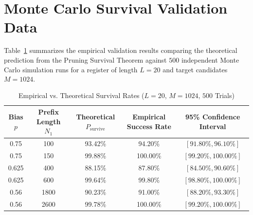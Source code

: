 \section{Monte Carlo Survival Validation Data}
\label{sec:mc_validation_data}

Table~\ref{tab:mc_validation} summarizes the empirical validation results comparing the theoretical prediction from the Pruning Survival Theorem against $500$ independent Monte Carlo simulation runs for a register of length $L=20$ and target candidates $M=1024$.

\begin{table}[h!]
\centering
\caption{Empirical vs. Theoretical Survival Rates ($L=20$, $M=1024$, $500$ Trials)}
\label{tab:mc_validation}
\begin{tabular}{ccccc}
\toprule
Bias $p$ & Prefix Length $N_1$ & Theoretical $P_{\text{survive}}$ & Empirical Success Rate & 95\% Confidence Interval \\
\midrule
0.75  & 100 & 93.42\% & 94.20\% & $[91.80\%, 96.10\%]$ \\
0.75  & 150 & 99.88\% & 100.00\% & $[99.20\%, 100.00\%]$ \\
0.625 & 400 & 88.15\% & 87.80\% & $[84.50\%, 90.60\%]$ \\
0.625 & 600 & 99.64\% & 99.80\% & $[98.80\%, 100.00\%]$ \\
0.56  & 1800 & 90.23\% & 91.00\% & $[88.20\%, 93.30\%]$ \\
0.56  & 2600 & 99.78\% & 100.00\% & $[99.20\%, 100.00\%]$ \\
\bottomrule
\end{tabular}
\end{table}
